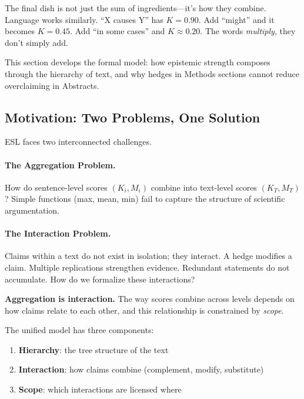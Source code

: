 \begin{analogybox}
The final dish is not just the sum of ingredients---it's how they combine. Language works similarly. ``X causes Y'' has $K = 0.90$. Add ``might'' and it becomes $K = 0.45$. Add ``in some cases'' and $K \approx 0.20$. The words \emph{multiply}, they don't simply add.

This section develops the formal model: how epistemic strength composes through the hierarchy of text, and why hedges in Methods sections cannot reduce overclaiming in Abstracts.
\end{analogybox}


\subsection{Motivation: Two Problems, One Solution}

ESL faces two interconnected challenges.

\paragraph{The Aggregation Problem.}
How do sentence-level scores $(K_i, M_i)$ combine into text-level scores $(K_T, M_T)$? Simple functions (max, mean, min) fail to capture the structure of scientific argumentation.

\paragraph{The Interaction Problem.}
Claims within a text do not exist in isolation; they interact. A hedge modifies a claim. Multiple replications strengthen evidence. Redundant statements do not accumulate. How do we formalize these interactions?

\begin{principlebox}
\textbf{Aggregation is interaction.} The way scores combine across levels depends on how claims relate to each other, and this relationship is constrained by \emph{scope}.

The unified model has three components:
\begin{enumerate}
    \item \textbf{Hierarchy}: the tree structure of the text
    \item \textbf{Interaction}: how claims combine (complement, modify, substitute)
    \item \textbf{Scope}: which interactions are licensed where
\end{enumerate}
\end{principlebox}


